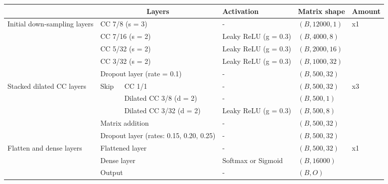 \documentclass[12pt]{article}
\begin{document}
    \begin{figure}[H]
        \centering
        \begin{scriptsize}
            \begin{tabular}{l|l|l|l|l|l|l|l|l|}
                &\multicolumn{5}{c|}{Layers} & Activation & Matrix shape & Amount\\
                \hline
                \hline
                \multirow{5}{2cm}{Initial down-sampling layers} &\multicolumn{5}{|l|}{CC 7/8 (s = 3)} & - & $(B, 12000, 1)$ &\multirow{5}{*}{x1}\\
                \cline{2-8}
                &\multicolumn{5}{|l|}{CC 7/16 (s = 2)} & Leaky ReLU (g = 0.3) & $(B, 4000, 8)$ &\\
                \cline{2-8}
                &\multicolumn{5}{|l|}{CC 5/32 (s = 2)} & Leaky ReLU (g = 0.3) & $(B, 2000, 16)$ &\\
                \cline{2-8}
                &\multicolumn{5}{|l|}{CC 3/32 (s = 2)} & Leaky ReLU (g = 0.3) & $(B, 1000, 32)$ &\\
                \cline{2-8}
                &\multicolumn{5}{|l|}{Dropout layer (rate = 0.1)} & - & $(B, 500, 32)$ &\\
                \bottomrule
                \multirow{5}{2cm}{Stacked dilated CC layers} &\multirow{3}{*}{Skip} & \multicolumn{4}{l|}{CC 1/1} & - & $(B, 500, 32)$ & \multirow{5}{*}{x3}\\
                \cline{3-8}
                & & \multicolumn{4}{l|}{Dilated CC 3/8 (d = 2)} & - & $(B, 500, 1)$ &\\
                \cline{3-8}
                & &\multicolumn{4}{l|}{Dilated CC 3/32 (d = 2)} & Leaky ReLU (g = 0.3) & $(B, 500, 8)$ &\\
                \cline{2-8}
                & \multicolumn{5}{|l|}{Matrix addition} & - & $(B, 500, 32)$ &\\
                \cline{2-8}
                & \multicolumn{5}{|l|}{Dropout layer (rates: 0.15, 0.20, 0.25)} & - & $(B, 500, 32)$ &\\
                \bottomrule
                \multirow{3}{2cm}{Flatten and dense layers} & \multicolumn{5}{|l|}{Flattened layer} & - & $(B, 500, 32)$ & \multirow{3}{*}{x1}\\
                \cline{2-8}
                & \multicolumn{5}{|l|}{Dense layer}& Softmax or Sigmoid & $(B, 16000)$ &\\
                \cline{2-8}
                & \multicolumn{5}{|l|}{Output} & - & $(B, O)$ &\\

\end{tabular}
\end{scriptsize}
\end{figure}
\end{document}
